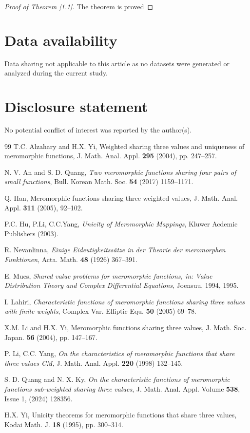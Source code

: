 \documentclass[12pt,leqno]{amsart}
\numberwithin{equation}{section}
\begin{document}
\begin{proof}[Proof of Theorem \ref{1.1}]
The theorem is proved
\end{proof}

\section*{Data availability}
Data sharing not applicable to this article as no datasets were generated or analyzed during the current study.

\section*{Disclosure statement}
No potential conflict of interest was reported by the author(s).

\begin{thebibliography}{99}
 T.C. Alzahary and H.X. Yi, Weighted sharing three values and uniqueness of meromorphic functions, J. Math. Anal. Appl. \textbf{295} (2004), pp. 247--257.

 N. V. An and S. D. Quang, \textit{Two meromorphic functions sharing four pairs of small functions}, Bull. Korean Math. Soc. \textbf{54} (2017) 1159--1171.

 Q. Han, Meromorphic functions sharing three weighted values, J. Math. Anal. Appl. \textbf{311} (2005), 92--102.

 P.C. Hu, P.Li, C.C.Yang, \textit{Unicity of Meromorphic Mappings}, Kluwer Acdemic Publishers (2003).

 R. Nevanlinna, \textit{Einige Eideutigkeitss\"atze in der Theorie der meromorphen Funktionen}, Acta. Math. \textbf{48} (1926) 367--391.

 E. Mues, \textit{Shared value problems for meromorphic functions, in: Value Distribution Theory and Complex Differential Equations}, Joensuu, 1994, 1995.

 I. Lahiri, \textit{Characteristic functions of meromorphic functions sharing three values with finite weights}, Complex Var. Elliptic Equ. \textbf{50} (2005) 69--78.

 X.M. Li and H.X. Yi, Meromorphic functions sharing three values, J. Math. Soc. Japan. \textbf{56} (2004), pp. 147--167.

  P. Li, C.C. Yang, \textit{On the characteristics of meromorphic functions that share three values CM}, J. Math. Anal. Appl. \textbf{220} (1998) 132--145.

 S. D. Quang and N. X. Ky, \textit{On the characteristic functions of meromorphic functions sub-weighted sharing three values}, J. Math. Anal. Appl. Volume \textbf{538}, Issue 1, (2024) 128356.

 H.X. Yi, Unicity theorems for meromorphic functions that share three values, Kodai Math. J. \textbf{18} (1995), pp. 300--314.

\end{thebibliography}
\end{document}
